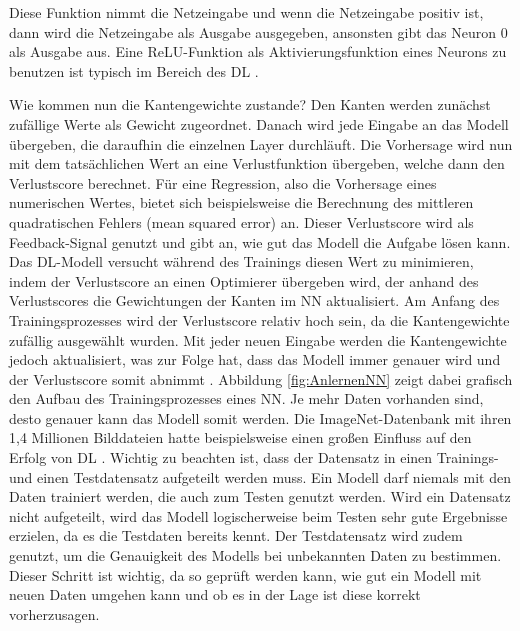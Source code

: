 Diese Funktion nimmt die Netzeingabe und wenn die Netzeingabe positiv ist, dann wird die Netzeingabe als Ausgabe ausgegeben, ansonsten gibt das Neuron 0 als Ausgabe aus.
Eine \ac{ReLU}-Funktion als Aktivierungsfunktion eines Neurons zu benutzen ist typisch im Bereich des \ac{DL} \cite[vgl. S.31]{NN}.

Wie kommen nun die Kantengewichte zustande? Den Kanten werden zunächst zufällige Werte als Gewicht zugeordnet. Danach wird jede Eingabe an das Modell übergeben, die
daraufhin die einzelnen Layer durchläuft. Die Vorhersage wird nun mit dem tatsächlichen Wert an eine Verlustfunktion übergeben, welche dann den Verlustscore berechnet.
Für eine Regression, also die Vorhersage eines numerischen Wertes, bietet sich beispielsweise die Berechnung des mittleren quadratischen Fehlers (mean squared error) an.
Dieser Verlustscore wird als Feedback-Signal genutzt und gibt an, wie gut das Modell die Aufgabe lösen kann. Das \ac{DL}-Modell versucht während des Trainings diesen 
Wert zu minimieren, indem der Verlustscore an einen Optimierer übergeben wird, der anhand des Verlustscores die Gewichtungen der Kanten im \ac{NN} aktualisiert.
Am Anfang des Trainingsprozesses wird der Verlustscore relativ hoch sein, da die Kantengewichte zufällig ausgewählt wurden. Mit jeder neuen Eingabe werden die Kantengewichte
jedoch aktualisiert, was zur Folge hat, dass das Modell immer genauer wird und der Verlustscore somit abnimmt \cite[vgl. S.30ff.]{DL_PY}.
Abbildung \ref*{fig:AnlernenNN} zeigt dabei grafisch den Aufbau des Trainingsprozesses eines \ac{NN}. Je mehr Daten vorhanden sind, desto genauer kann das 
Modell somit werden. Die ImageNet-Datenbank mit ihren 1,4 Millionen Bilddateien hatte beispielsweise einen großen Einfluss auf den Erfolg von \ac{DL} \cite[vgl. S.45]{DL_PY}.
Wichtig zu beachten ist, dass der Datensatz in einen Trainings- und einen Testdatensatz aufgeteilt werden muss. Ein Modell darf niemals mit den Daten trainiert werden,
die auch zum Testen genutzt werden. Wird ein Datensatz nicht aufgeteilt, wird das Modell logischerweise beim Testen sehr gute Ergebnisse erzielen, da es die 
Testdaten bereits kennt. Der Testdatensatz wird zudem genutzt, um die Genauigkeit des Modells bei unbekannten Daten zu bestimmen. Dieser Schritt ist wichtig, da 
so geprüft werden kann, wie gut ein Modell mit neuen Daten umgehen kann und ob es in der Lage ist diese korrekt vorherzusagen.

